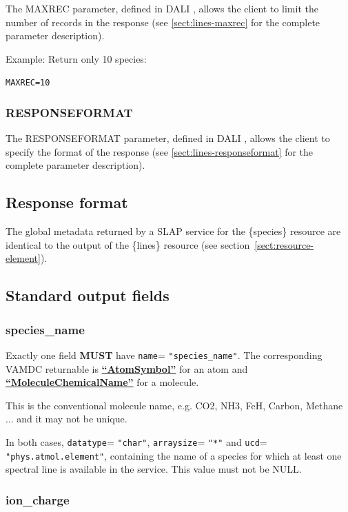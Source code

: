 \documentclass[11pt,a4paper]{ivoa}
\def\attrval#1#2{\texttt{#1}\discretionary{}{}{}=\discretionary{}{}{}%
  \texttt{"#2"}}
\def\vamdcret#1{\href{https://dictionary.vamdc.eu/returnables/\##1}{\textbf{``\color{vamdccolor}#1''}}}
\newcommand{\parexample}[1]{\noindent\quad\texttt{#1}}
\begin{document}
The MAXREC parameter, defined in DALI \citep{2017ivoa.spec.0517D}, allows the client to
limit the number of records in the response
(see \ref{sect:lines-maxrec} for the complete parameter description).

Example: Return only 10 species:

\parexample{MAXREC=10}

\subsubsection{RESPONSEFORMAT}

The RESPONSEFORMAT parameter, defined in DALI \citep{2017ivoa.spec.0517D}, allows the client to specify the format
of the response (see \ref{sect:lines-responseformat} for the complete parameter description).

\subsection{Response format}
\label{species-output}

The global metadata returned by a SLAP service for the \{species\}
resource are identical to the output of the \{lines\} resource (see section~\ref{sect:resource-element}).

\subsection{Standard output fields}
\label{species-fields}

\subsubsection{species\_name}

Exactly one field \textbf{MUST} have
\attrval{name}{species\_name}. The
corresponding VAMDC returnable is  \vamdcret{AtomSymbol} for an atom
and \vamdcret{MoleculeChemicalName} for a molecule.

This is the conventional molecule name, e.g. CO2, NH3, FeH, Carbon, Methane ... and it may not be unique.

In both cases, \attrval{datatype}{char},
\attrval{arraysize}{*} and
\attrval{ucd}{phys.atmol.element}, containing the name of a
species for which at least one spectral line is available in
the service. This value must not be NULL.

\subsubsection{ion\_charge}
\end{document}
